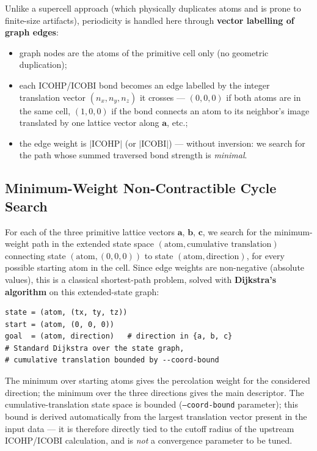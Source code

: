 \documentclass[11pt,a4paper]{article}
\begin{document}
Unlike a supercell approach (which physically duplicates atoms and is
prone to finite-size artifacts), periodicity is handled here through
\textbf{vector labelling of graph edges}:

\begin{itemize}
  \item graph nodes are the atoms of the primitive cell only (no geometric
    duplication);
  \item each ICOHP/ICOBI bond becomes an edge labelled by the integer
    translation vector $(n_x, n_y, n_z)$ it crosses --- $(0,0,0)$ if both
    atoms are in the same cell, $(1,0,0)$ if the bond connects an atom to
    its neighbor's image translated by one lattice vector along
    $\mathbf{a}$, etc.;
  \item the edge weight is $|\text{ICOHP}|$ (or $|\text{ICOBI}|$) ---
    without inversion: we search for the path whose summed traversed bond
    strength is \emph{minimal}.
\end{itemize}

\subsection{Minimum-Weight Non-Contractible Cycle Search}

For each of the three primitive lattice vectors $\mathbf{a}$,
$\mathbf{b}$, $\mathbf{c}$, we search for the minimum-weight path in the
extended state space $(\text{atom}, \text{cumulative translation})$
connecting state $(\text{atom}, (0,0,0))$ to state
$(\text{atom}, \text{direction})$, for every possible starting atom in the
cell. Since edge weights are non-negative (absolute values), this is a
classical shortest-path problem, solved with \textbf{Dijkstra's algorithm}
on this extended-state graph:

\begin{lstlisting}
state = (atom, (tx, ty, tz))
start = (atom, (0, 0, 0))
goal  = (atom, direction)   # direction in {a, b, c}
# Standard Dijkstra over the state graph,
# cumulative translation bounded by --coord-bound
\end{lstlisting}

The minimum over starting atoms gives the percolation weight for the
considered direction; the minimum over the three directions gives the main
descriptor. The cumulative-translation state space is bounded
(\texttt{--coord-bound} parameter); this bound is derived automatically
from the largest translation vector present in the input data --- it is
therefore directly tied to the cutoff radius of the upstream ICOHP/ICOBI
calculation, and is \emph{not} a convergence parameter to be tuned.
\end{document}
